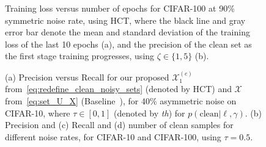\documentclass[review]{elsarticle}
\begin{document}
\begin{figure}[t]
\centering
{}\quad\quad
{}
\caption{Training loss versus number of epochs for CIFAR-100 at 90\% symmetric noise rate, using HCT, where the black line and gray error bar denote the mean and standard deviation of the training loss of the last 10 epochs (a), and the precision of the clean set as the first stage training progresses, using $\zeta \in \{1,5\}$ (b).
}
\label{fig:loss_epoch}
\end{figure}





\begin{figure}[ht!]
\centering
{}\quad\quad
{}
\quad
{}


\caption{(a) Precision versus Recall for our proposed $\mathcal{X}_1^{(e)}$ from~\eqref{eq:redefine_clean_noisy_sets} (denoted by HCT) and $\mathcal{X}$ from~\eqref{eq:set_U_X} (Baseline~\cite{li2020dividemix}), for 40\% asymmetric noise on CIFAR-10, where $\tau \in [0,1]$ (denoted by \emph{th}) for $p(\text{clean}|\ell,\gamma)$. (b) Precision  and (c) Recall and (d) number of clean samples for different noise rates, for CIFAR-10 and CIFAR-100, using $\tau =0.5$.}
\label{fig:precison}
\end{figure}
\end{document}
